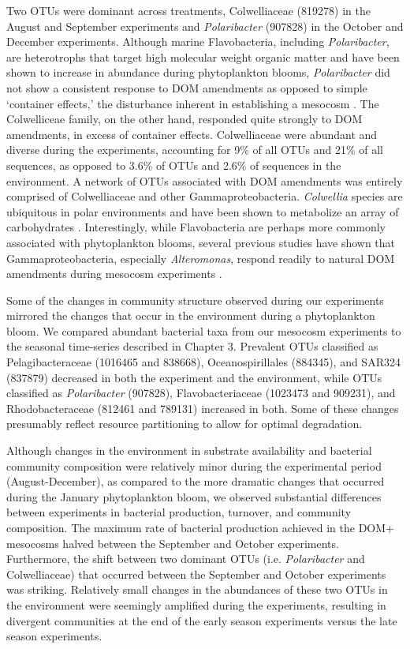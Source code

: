 Two OTUs were dominant across treatments, Colwelliaceae (819278) in the August and September experiments and \emph{Polaribacter} (907828) in the October and December experiments. Although marine Flavobacteria, including \emph{Polaribacter}, are heterotrophs that target high molecular weight organic matter and have been shown to increase in abundance during phytoplankton blooms, \emph{Polaribacter} did not show a consistent response to DOM amendments as opposed to simple `container effects,' the disturbance inherent in establishing a mesocosm \citep{cottrell2000natural,Pinhassi2004-kc,Abell2005-xu,gonzalez2008genome,Fernandez-Gomez2013-wr,Xing2015-kz,delong1993phylogenetic,Glockner1999-yc,West2008-vp,Teeling2012-jz}. The Colwelliceae family, on the other hand, responded quite strongly to DOM amendments, in excess of container effects. Colwelliaceae were abundant and diverse during the experiments, accounting for 9\% of all OTUs and 21\% of all sequences, as opposed to 3.6\% of OTUs and 2.6\% of sequences in the environment. A network of OTUs associated with DOM amendments was entirely comprised of Colwelliaceae and other Gammaproteobacteria. \emph{Colwellia} species are ubiquitous in polar environments and have been shown to metabolize an array of carbohydrates \citep{techtmann2016colwellia}. Interestingly, while Flavobacteria are perhaps more commonly associated with phytoplankton blooms, several previous studies have shown that Gammaproteobacteria, especially \emph{Alteromonas}, respond readily to natural DOM amendments during mesocosm experiments \citep{mccarren2010microbial,Landa2014-yg,romera2011net}.

Some of the changes in community structure observed during our experiments mirrored the changes that occur in the environment during a phytoplankton bloom. We compared abundant bacterial taxa from our mesocosm experiments to the seasonal time-series described in Chapter 3. Prevalent OTUs classified as Pelagibacteraceae (1016465 and 838668), Oceanospirillales (884345), and SAR324 (837879) decreased in both the experiment and the environment, while OTUs classified as \emph{Polaribacter} (907828), Flavobacteriaceae (1023473 and 909231), and Rhodobacteraceae (812461 and 789131) increased in both. Some of these changes presumably reflect resource partitioning to allow for optimal degradation. 

Although changes in the environment in substrate availability and bacterial community composition were relatively minor during the experimental period (August-December), as compared to the more dramatic changes that occurred during the January phytoplankton bloom, we observed substantial differences between experiments in bacterial production, turnover, and community composition. The maximum rate of bacterial production achieved in the DOM+ mesocosms halved between the September and October experiments. Furthermore, the shift between two dominant OTUs (i.e. \emph{Polaribacter} and Colwelliaceae) that occurred between the September and October experiments was striking. Relatively small changes in the abundances of these two OTUs in the environment were seemingly amplified during the experiments, resulting in divergent communities at the end of the early season experiments versus the late season experiments. 


